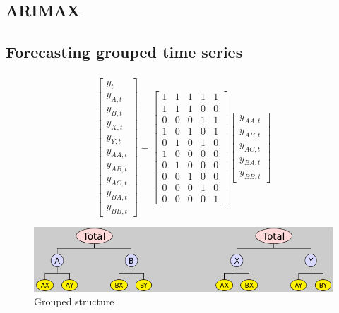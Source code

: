 \documentclass[c, dvipsnames]{beamer}  %
\begin{document}
\subsection{ARIMAX}




\subsection{Forecasting 	grouped time series}



\begin{frame}[shrink=5]
\frametitle{\insertsection} 
\framesubtitle{\insertsubsection}




\[\begin{bmatrix}
y_{t} \\
y_{A, t} \\
y_{B, t} \\
y_{X, t} \\
y_{Y, t} \\
y_{AA, t} \\
y_{AB, t} \\
y_{AC, t} \\
y_{BA, t} \\
y_{BB, t}
\end{bmatrix}
=
\begin{bmatrix}
1 & 1 & 1 & 1 & 1 \\
1 & 1 & 1 & 0 & 0 \\
0 & 0 & 0 & 1 & 1 \\
1 & 0 & 1 & 0 & 1 \\
0 & 1 & 0 & 1 & 0 \\
1  & 0  & 0  & 0  & 0  \\
0  & 1  & 0  & 0  & 0  \\
0  & 0  & 1  & 0  & 0  \\
0  & 0  & 0  & 1  & 0  \\
0  & 0  & 0  & 0  & 1
\end{bmatrix}
\begin{bmatrix}
y_{AA, t} \\
y_{AB, t} \\
y_{AC, t} \\
y_{BA, t} \\
y_{BB, t}
\end{bmatrix}\]


\begin{figure}
	\centering
	\includegraphics[width=0.7\linewidth]{screenshot011}
	\caption{Grouped structure}
	\label{fig:screenshot011}
\end{figure}


\end{frame}
\end{document}
